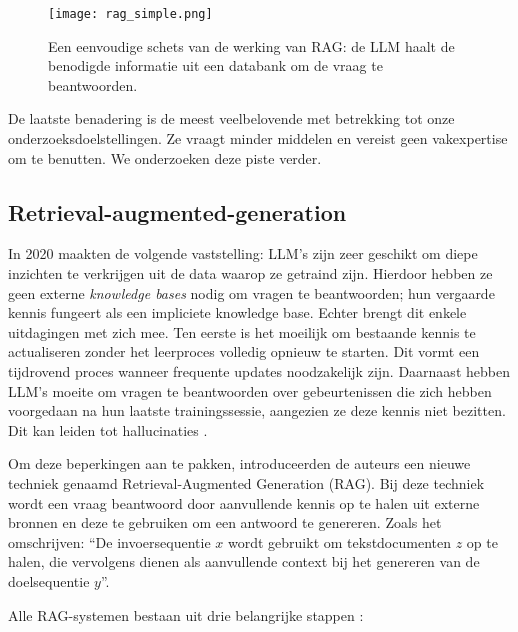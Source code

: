 \begin{figure}
    \centering
    \texttt{[image: rag\_simple.png]}
    \caption[Schets van RAG]{\label{fig:rag_simple}Een eenvoudige schets van de werking van \acrshort{RAG}: de \acrshort{LLM} haalt de benodigde informatie uit een databank om de vraag te beantwoorden.}
\end{figure}

De laatste benadering is de meest veelbelovende met betrekking tot onze onderzoeksdoelstellingen. Ze vraagt minder middelen en vereist geen vakexpertise om te benutten. We onderzoeken deze piste verder.

\subsection{Retrieval-augmented-generation}%
\label{subsec:rag}

In 2020 maakten \textcite{Lewis2020} de volgende vaststelling: LLM's zijn zeer geschikt om diepe inzichten te verkrijgen uit de data waarop ze getraind zijn. Hierdoor hebben ze geen externe \emph{knowledge bases} nodig om vragen te beantwoorden; hun vergaarde kennis fungeert als een impliciete knowledge base. Echter brengt dit enkele uitdagingen met zich mee. Ten eerste is het moeilijk om bestaande kennis te actualiseren zonder het leerproces volledig opnieuw te starten. Dit vormt een tijdrovend proces wanneer frequente updates noodzakelijk zijn. Daarnaast hebben LLM's moeite om vragen te beantwoorden over gebeurtenissen die zich hebben voorgedaan na hun laatste trainingssessie, aangezien ze deze kennis niet bezitten. Dit kan leiden tot hallucinaties \autocite{Gao2023}.

Om deze beperkingen aan te pakken, introduceerden de auteurs een nieuwe techniek genaamd Retrieval-Augmented Generation (RAG). Bij deze techniek wordt een vraag beantwoord door aanvullende kennis op te halen uit externe bronnen en deze te gebruiken om een antwoord te genereren. Zoals \textcite{Lewis2020} het omschrijven: ``De invoersequentie $x$ wordt gebruikt om tekstdocumenten $z$ op te halen, die vervolgens dienen als aanvullende context bij het genereren van de doelsequentie $y$''.

Alle RAG-systemen bestaan uit drie belangrijke stappen \autocite{Gao2023}:  

